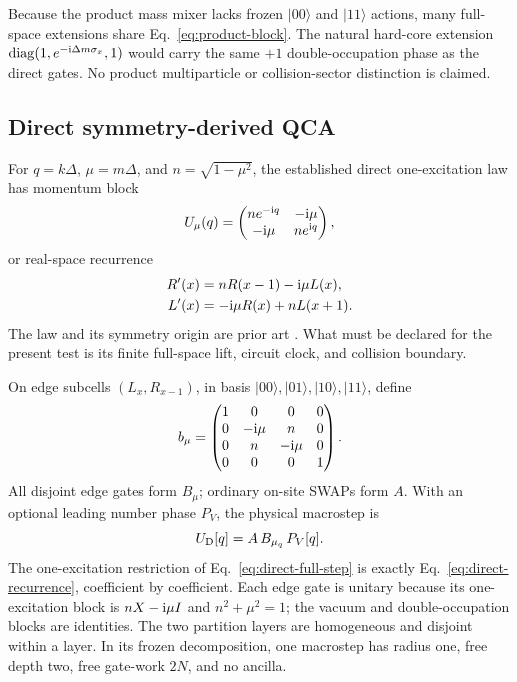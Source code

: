 Because the product mass mixer lacks frozen $\lvert00\rangle$ and
$\lvert11\rangle$ actions, many full-space extensions share
Eq.~\eqref{eq:product-block}.  The natural hard-core extension
$\operatorname{diag}(1,e^{-\mathrm{i}\Delta m\sigma_x},1)$ would carry the same
$+1$ double-occupation phase as the direct gates.  No product multiparticle or
collision-sector distinction is claimed.

\subsection{Direct symmetry-derived QCA}

For $q=k\Delta$, $\mu=m\Delta$, and $n=\sqrt{1-\mu^2}$, the established direct
one-excitation law has momentum block
\begin{equation}
 U_\mu(q)=
 \begin{pmatrix}
   ne^{-\mathrm{i} q}&-\mathrm{i}\mu\\
   -\mathrm{i}\mu&ne^{\mathrm{i} q}
 \end{pmatrix},
 \label{eq:direct-block}
\end{equation}
or real-space recurrence
\begin{equation}
 \begin{split}
 R'(x)&=nR(x-1)-\mathrm{i}\mu L(x),\\
 L'(x)&=-\mathrm{i}\mu R(x)+nL(x+1).
 \end{split}
 \label{eq:direct-recurrence}
\end{equation}
The law and its symmetry origin are prior art
\citep{Bisio2015QuantumFieldQCA,DAriano2014InformationPrinciples}.  What must be
declared for the present test is its finite full-space lift, circuit clock, and
collision boundary.

On edge subcells $(L_x,R_{x-1})$, in basis
$\lvert00\rangle,\lvert01\rangle,\lvert10\rangle,\lvert11\rangle$, define
\begin{equation}
 b_\mu=
 \begin{pmatrix}
 1&0&0&0\\
 0&-\mathrm{i}\mu&n&0\\
 0&n&-\mathrm{i}\mu&0\\
 0&0&0&1
 \end{pmatrix}.
 \label{eq:edge-gate}
\end{equation}
All disjoint edge gates form $B_\mu$; ordinary on-site SWAPs form $A$.  With
an optional leading number phase $P_V$, the physical macrostep is
\begin{equation}
  U_{\mathrm{D}}[q]=A\,B_{\mu_q}\,P_V[q].
  \label{eq:direct-full-step}
\end{equation}
The one-excitation restriction of Eq.~\eqref{eq:direct-full-step} is exactly
Eq.~\eqref{eq:direct-recurrence}, coefficient by coefficient.  Each edge gate is
unitary because its one-excitation block is $nX-\mathrm{i}\mu I$ and
$n^2+\mu^2=1$; the vacuum and double-occupation blocks are identities.  The
two partition layers are homogeneous and disjoint within a layer.  In its
frozen decomposition, one macrostep has radius one, free depth two, free
gate-work $2N$, and no ancilla.

